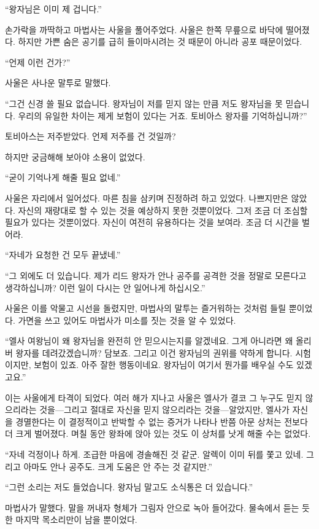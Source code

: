 ``왕자님은 이미 제 겁니다.''

손가락을 까딱하고 마법사는 사울을 풀어주었다. 사울은 한쪽 무릎으로 바닥에 떨어졌다. 하지만 가쁜 숨은 공기를 급히 들이마시려는 것 때문이 아니라 공포 때문이었다.

``언제 이런 건가?''

사울은 사나운 말투로 말했다.

``그건 신경 쓸 필요 없습니다. 왕자님이 저를 믿지 않는 만큼 저도 왕자님을 못 믿습니다. 우리의 유일한 차이는 제게 보험이 있다는 거죠. 토비아스 왕자를 기억하십니까?''

토비아스는 저주받았다. 언제 저주를 건 것일까?

하지만 궁금해해 보아야 소용이 없었다.

``굳이 기억나게 해줄 필요 없네.''

사울은 자리에서 일어섰다. 마른 침을 삼키며 진정하려 하고 있었다. 나쁘지만은 않았다. 자신의 재량대로 할 수 있는 것을 예상하지 못한 것뿐이었다. 그저 조금 더 조심할 필요가 있다는 것뿐이었다. 자신이 여전히 유용하다는 것을 보여라. 조금 더 시간을 벌어라.

``자네가 요청한 건 모두 끝냈네.''

``그 외에도 더 있습니다. 제가 리드 왕자가 안나 공주를 공격한 것을 정말로 모른다고 생각하십니까? 이런 일이 다시는 안 일어나게 하십시오.''

사울은 이를 악물고 시선을 돌렸지만, 마법사의 말투는 즐거워하는 것처럼 들릴 뿐이었다. 가면을 쓰고 있어도 마법사가 미소를 짓는 것을 알 수 있었다.

``엘사 여왕님이 왜 왕자님을 완전히 안 믿으시는지를 알겠네요. 그게 아니라면 왜 올리버 왕자를 데려갔겠습니까? 담보죠. 그리고 이건 왕자님의 권위를 약하게 합니다. 시험이지만, 보험이 있죠. 아주 잘한 행동이네요. 왕자님이 여기서 뭔가를 배우실 수도 있겠고요.''

이는 사울에게 타격이 되었다. 여러 해가 지나고 사울은 엘사가 결코 그 누구도 믿지 않으리라는 것을—그리고 절대로 자신을 믿지 않으리라는 것을—알았지만, 엘사가 자신을 경멸한다는 이 결정적이고 반박할 수 없는 증거가 나타나 반쯤 아문 상처는 전보다 더 크게 벌어졌다. 며칠 동안 왕좌에 앉아 있는 것도 이 상처를 낫게 해줄 수는 없었다.

``자네 걱정이나 하게. 조급한 마음에 경솔해진 것 같군. 알렉이 이미 뒤를 쫓고 있네. 그리고 아마도 안나 공주도. 크게 도움은 안 주는 것 같지만.''

``그런 소리는 저도 들었습니다. 왕자님 말고도 소식통은 더 있습니다.''

마법사가 말했다. 말을 꺼내자 형체가 그림자 안으로 녹아 들어갔다. 물속에서 듣는 듯한 마지막 목소리만이 남을 뿐이었다.

